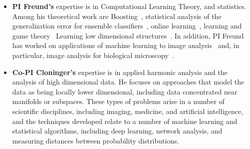 \documentclass{article}
\begin{document}
\begin{itemize}
\item {\bf PI Freund's} expertise is in Computational Learning Theory,
  and statistics. Among his theoretical work are Boosting~\cite{boostingbook},
  statistical analysis of the generalization error for ensemble
  classifiers~\cite{SchapireFrBaLe98,FreundMaSc04}, online learning~\cite{CesabianchiFrHeHaScWa97,FreundSc97}, learning and game
  theory~\cite{FreundKeMaRoRuSc95,FreundSc99,FreundOp02} Learning low dimensional structures~\cite{DasguptaFr09}.  In
  addition, PI Freund has worked on applications of machine learning
  to image analysis~\cite{LevinViFr03} and, in particular, image analysis for
  biological microscopy~\cite{Giannone07,LiuFrSp08,PareLeKoBeFrMc09,Valmianski10,ChenEtAl2019}.

\item {\bf Co-PI Cloninger's} expertise is in applied harmonic
  analysis and the analysis of high dimensional data.  He focuses on
  approaches that model the data as being locally lower dimensional,
  including data concentrated near manifolds or subspaces.  These
  types of problems arise in a number of scientific disciplines,
  including imaging, medicine, and artificial intelligence, and the
  techniques developed relate to a number of machine learning and
  statistical algorithms, including deep learning, network analysis,
  and measuring distances between probability distributions.


\end{itemize}
\end{document}
